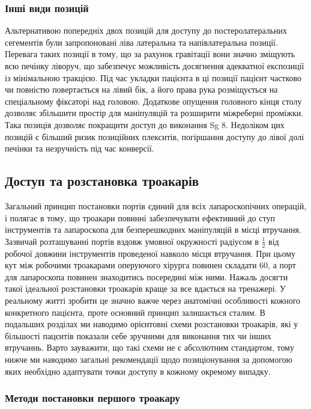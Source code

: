 \begin{refsection}
\subsubsection{Інші види позицій}

Альтернативою попередніх двох позицій для доступу до постеролатеральних сегементів були запропоновані ліва латеральна та напівлатеральна позиції. Перевага таких позиції в тому, що за рахунок гравітації вони значно зміщують всю печінку ліворуч, що забезпечує можливість досягнення адекватної експозиції із мінімальною тракцією. Під час укладки пацієнта в ці позиції пацієнт частково чи повністю повертається на лівий бік, а його права рука розміщується на спеціальному фіксаторі над головою. Додаткове опущення головного кінця столу дозволяє збільшити простір для маніпуляцій та розширити міжреберні проміжки. Така позиція дозволяє покращити доступ до виконання Sg 8. Недоліком цих позицій є більший ризик позиційних плекситів, погіршання доступу до лівої долі печінки та незручність під час конверсії.

\subsection{Доступ та розстановка троакарів}

Загальний принцип постановки портів єдиний для всіх лапароскопічних операцій, і полягає в тому, що троакари повинні забезпечувати ефективний до ступ інструментів та лапароскопа для безперешкодних маніпуляцій в місці втручання. Зазвичай розташуванні портів вздовж умовної окружності радіусом в \( \frac{1}{2} \) від робочої довжини інструментів проведеної навколо місця втручання. При цьому кут між робочими троакарами оперуючого хірурга повинен складати 60\degree, а порт для лапароскопа повинен знаходитись посередині між ними. Нажаль досягти такої ідеальної розстановки троакарів краще за все вдається на тренажері. У реальному житті зробити це значно важче через анатомічні особливості кожного конкретного пацієнта, проте основний принцип залишається сталим. В подальших розділах ми наводимо орієнтовні схеми розстановки троакарів, які у більшості пацєнтів показали себе зручними для виконання тих чи інших втручаннь. Варто зауважити, що такі схеми не є абсолютним стандартом, тому нижче ми наводимо загальні рекомендації щодо позиціонування за допомогою яких необхідно адаптувати точки доступу в кожному окремому випадку.

\subsubsection{Методи постановки першого троакару}


\end{refsection}
